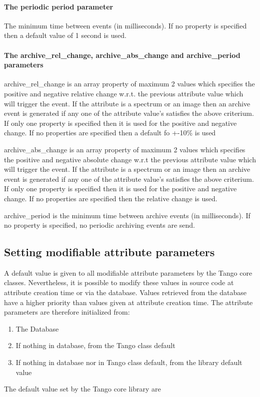 \paragraph{The periodic period parameter}

The minimum time between events (in milliseconds). If no property
is specified then a default value of 1 second is used.


\paragraph{The archive\_rel\_change, archive\_abs\_change
and archive\_period parameters}

archive\_rel\_change is an array property of maximum 2 values which
specifies the positive and negative relative change w.r.t. the previous
attribute value which will trigger the event. If the attribute is
a spectrum or an image then an archive event is generated if any one
of the attribute value's satisfies the above criterium. If only one
property is specified then it is used for the positive and negative
change. If no properties are specified then a default fo +-10\% is
used

archive\_abs\_change is an array property of maximum 2 values which
specifies the positive and negative absolute change w.r.t the previous
attribute value which will trigger the event. If the attribute is
a spectrum or an image then an archive event is generated if any one
of the attribute value's satisfies the above criterium. If only one
property is specified then it is used for the positive and negative
change. If no properties are specified then the relative change is
used.

archive\_period is the minimum time between archive events (in milliseconds).
If no property is specified, no periodic archiving events are send.


\subsection{Setting modifiable attribute parameters}

A default value is given to all modifiable attribute parameters by
the Tango core classes. Nevertheless, it is possible to modify these
values in source code at attribute creation time or via the database.
Values retrieved from the database have a higher priority than values
given at attribute creation time. The attribute parameters are therefore
initialized from:
\begin{enumerate}
\item The Database
\item If nothing in database, from the Tango class default
\item If nothing in database nor in Tango class default, from the library
default value
\end{enumerate}
The default value set by the Tango core library are

